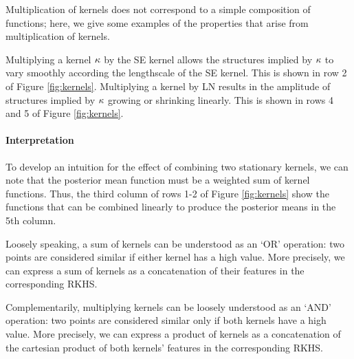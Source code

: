 \documentclass[twoside]{article}
\begin{document}
Multiplication of kernels does not correspond to a simple composition of functions; here, we give some examples of the properties that arise from multiplication of kernels.

%
%


Multiplying a kernel $\kappa$ by the SE kernel allows the structures implied by $\kappa$ to vary smoothly according the lengthscale of the SE kernel.  This is shown in row 2 of Figure \ref{fig:kernels}.
Multiplying a kernel by LN results in the amplitude of structures implied by $\kappa$ growing or shrinking linearly. This is shown in rows 4 and 5 of Figure \ref{fig:kernels}.
%


\paragraph{Interpretation}

To develop an intuition for the effect of combining two stationary kernels, we can note that the posterior mean function must be a weighted sum of kernel functions.  Thus, the third column of rows 1-2 of Figure \ref{fig:kernels} show the functions that can be combined linearly to produce the posterior means in the 5th column.

Loosely speaking, a sum of kernels can be understood as an `OR' operation: two points are considered similar if either kernel has a high value.
More precisely, we can express a sum of kernels as a concatenation of their features in the corresponding RKHS.

Complementarily, multiplying kernels can be loosely understood as an `AND' operation: two points are considered similar only if both kernels have a high value.
More precisely, we can express a product of kernels as a concatenation of the cartesian product of both kernels' features in the corresponding RKHS.
\end{document}
